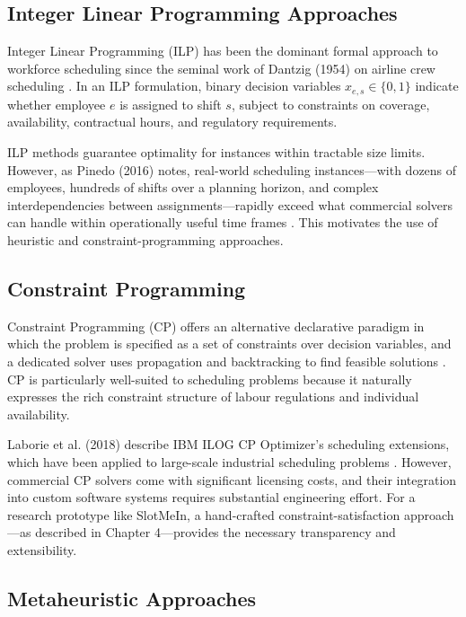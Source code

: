 \documentclass[12pt,a4paper]{report}
\begin{document}
\subsection{Integer Linear Programming Approaches}

Integer Linear Programming (ILP) has been the dominant formal approach to workforce scheduling since the seminal work of Dantzig (1954) on airline crew scheduling \cite{dantzig_1954}. In an ILP formulation, binary decision variables $x_{e,s} \in \{0, 1\}$ indicate whether employee $e$ is assigned to shift $s$, subject to constraints on coverage, availability, contractual hours, and regulatory requirements.

ILP methods guarantee optimality for instances within tractable size limits. However, as Pinedo (2016) notes, real-world scheduling instances—with dozens of employees, hundreds of shifts over a planning horizon, and complex interdependencies between assignments—rapidly exceed what commercial solvers can handle within operationally useful time frames \cite{pinedo_2016}. This motivates the use of heuristic and constraint-programming approaches.

\subsection{Constraint Programming}

Constraint Programming (CP) offers an alternative declarative paradigm in which the problem is specified as a set of constraints over decision variables, and a dedicated solver uses propagation and backtracking to find feasible solutions \cite{rossi_et_al_2006}. CP is particularly well-suited to scheduling problems because it naturally expresses the rich constraint structure of labour regulations and individual availability.

Laborie et al. (2018) describe IBM ILOG CP Optimizer's scheduling extensions, which have been applied to large-scale industrial scheduling problems \cite{laborie_et_al_2018}. However, commercial CP solvers come with significant licensing costs, and their integration into custom software systems requires substantial engineering effort. For a research prototype like SlotMeIn, a hand-crafted constraint-satisfaction approach—as described in Chapter 4—provides the necessary transparency and extensibility.

\subsection{Metaheuristic Approaches}
\end{document}
